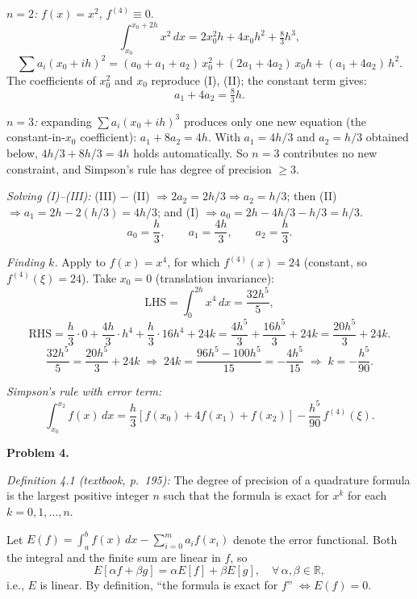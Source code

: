 \documentclass[12pt,letterpaper]{article}
\begin{document}
\textit{$n = 2$:} $f(x) = x^2$, $f^{(4)} \equiv 0$.
\[
\int_{x_0}^{x_0+2h} x^2\,dx = 2x_0^2 h + 4 x_0 h^2 + \tfrac{8}{3}h^3,
\]
\[
\sum a_i (x_0+ih)^2 = (a_0+a_1+a_2)\,x_0^2 + (2a_1 + 4a_2)\,x_0 h + (a_1 + 4a_2)\,h^2.
\]
The coefficients of $x_0^2$ and $x_0$ reproduce (I), (II); the constant term gives:
\[
a_1 + 4 a_2 = \tfrac{8}{3}h. \tag{III}
\]

\textit{$n = 3$:} expanding $\sum a_i (x_0+ih)^3$ produces only one new equation (the constant-in-$x_0$ coefficient): $a_1 + 8 a_2 = 4h$. With $a_1 = 4h/3$ and $a_2 = h/3$ obtained below, $4h/3 + 8h/3 = 4h$ holds automatically. So $n = 3$ contributes no new constraint, and Simpson's rule has degree of precision $\ge 3$.

\textit{Solving (I)--(III):} (III) $-$ (II) $\Rightarrow 2a_2 = 2h/3 \Rightarrow a_2 = h/3$;
then (II) $\Rightarrow a_1 = 2h - 2(h/3) = 4h/3$;
and (I) $\Rightarrow a_0 = 2h - 4h/3 - h/3 = h/3$.
\[
\boxed{a_0 = \frac{h}{3}, \qquad a_1 = \frac{4h}{3}, \qquad a_2 = \frac{h}{3}.}
\]

\textit{Finding $k$.} Apply to $f(x) = x^4$, for which $f^{(4)}(x) = 24$ (constant, so $f^{(4)}(\xi) = 24$). Take $x_0 = 0$ (translation invariance):
\[
\text{LHS} = \int_0^{2h} x^4\,dx = \frac{32 h^5}{5},
\]
\[
\text{RHS} = \frac{h}{3}\cdot 0 + \frac{4h}{3}\cdot h^4 + \frac{h}{3}\cdot 16 h^4 + 24 k = \frac{4h^5}{3} + \frac{16 h^5}{3} + 24 k = \frac{20 h^5}{3} + 24 k.
\]
\[
\frac{32 h^5}{5} = \frac{20 h^5}{3} + 24 k \;\Longrightarrow\; 24 k = \frac{96 h^5 - 100 h^5}{15} = -\frac{4 h^5}{15} \;\Longrightarrow\; \boxed{k = -\frac{h^5}{90}.}
\]

\textit{Simpson's rule with error term:}
\[
\boxed{\int_{x_0}^{x_2} f(x)\,dx = \frac{h}{3}\left[f(x_0) + 4 f(x_1) + f(x_2)\right] - \frac{h^5}{90}\,f^{(4)}(\xi).}
\]



\textbf{Problem 4.}

\textit{Definition 4.1 (textbook, p.\ 195):} The degree of precision of a quadrature formula is the largest positive integer $n$ such that the formula is exact for $x^k$ for each $k = 0, 1, \ldots, n$.

Let $E(f) = \int_a^b f(x)\,dx - \sum_{i=0}^{m} a_i f(x_i)$ denote the error functional. Both the integral and the finite sum are linear in $f$, so
\[
E[\alpha f + \beta g] = \alpha E[f] + \beta E[g], \quad \forall\, \alpha, \beta \in \mathbb{R},
\]
i.e., $E$ is linear. By definition, ``the formula is exact for $f$'' $\iff E(f) = 0$.
\end{document}
